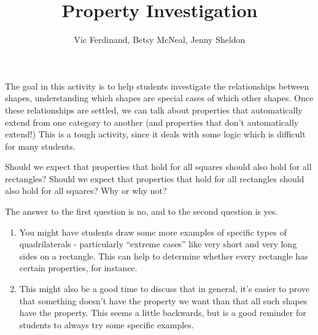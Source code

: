 \documentclass[handout]{ximera}
\title{Property Investigation}
\author{Vic Ferdinand, Betsy McNeal, Jenny Sheldon}
\begin{document}
\begin{abstract}\end{abstract}
\maketitle

\begin{instructorIntro}
The goal in this activity is to help students investigate the relationships between shapes, understanding which shapes are special cases of which other shapes.  Once these relationships are settled, we can talk about properties that automatically extend from one category to another (and properties that don't automatically extend!)  This is a tough activity, since it deals with some logic which is difficult for many students.
\end{instructorIntro}

\begin{problem} Should we expect that properties that hold for all squares should also hold for all rectangles?  Should we expect that properties that hold for all rectangles should also hold for all squares?  Why or why not? 

\begin{solution}
The answer to the first question is no, and to the second question is yes.
\end{solution}

\begin{instructorNotes}
\begin{enumerate}
\item You might have students draw some more examples of specific types of quadrilaterals - particularly ``extreme cases'' like very short and very long sides on a rectangle.  This can help to determine whether every rectangle has certain properties, for instance.
\item This might also be a good time to discuss that in general, it's easier to prove that something doesn't have the property we want than that all such shapes have the property.  This seems a little backwards, but is a good reminder for students to always try some specific examples.
\end{enumerate}
\end{instructorNotes}
\end{problem}
\end{document}
